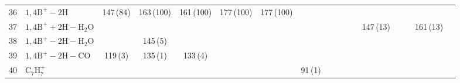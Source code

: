 \documentclass[]{article}
\begin{document}
\begin{table}
{\begin{tabular}{ll|ccccc|ccccc|ccccc}
  36 & $\mathrm{1{,}4B^+{-}2H}$ & 147\,(84) & 163\,(100) & 161\,(100) & 177\,(100) & 177\,(100) &  &  &  &  &  &  &  &  &  &  \\ 
  37 & $\mathrm{1{,}4B^+{+}2H{-}H_{2}O}$ &  &  &  &  &  &  &  &  &  &  & 147\,(13) &  &  & 161\,(13) &  \\ 
  38 & $\mathrm{1{,}4B^+{-}2H{-}H_{2}O}$ &  & 145\,(5) &  &  &  &  &  &  &  &  &  &  &  &  &  \\ 
  39 & $\mathrm{1{,}4B^+{-}2H{-}CO}$ & 119\,(3) & 135\,(1) & 133\,(4) &  &  &  &  &  &  &  &  &  &  &  &  \\ 
  40 & $\mathrm{C_{7}H_{7}^+}$ &  &  &  &  &  & 91\,(1) &  &  &  &  &  &  &  &  &  \\ 
   \bottomrule
\end{tabular}
}
\end{table}

\qquad
\end{document}

